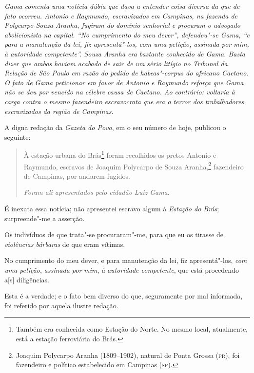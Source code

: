 \begin{flushleft}
{\footnotesize\itshape
Gama comenta uma notícia dúbia que dava a entender coisa diversa
da que de fato ocorreu. Antonio e Raymundo, escravizados em Campinas, na
fazenda de Polycarpo Souza Aranha, fugiram do domínio senhorial e
procuram o advogado abolicionista na capital. ``No cumprimento do meu
dever'', defendeu"-se Gama, ``e para a manutenção da lei, fiz
apresentá"-los, com uma petição, assinada por mim, à autoridade
competente''. Souza Aranha era bastante conhecido de Gama. Basta dizer
que ambos haviam acabado de sair de um sério litígio no Tribunal da
Relação de São Paulo em razão do pedido de \emph{habeas"-corpus} do
africano Caetano. O fato de Gama peticionar em favor de Antonio e
Raymundo reforça que Gama não se deu por vencido na célebre causa de
Caetano. Ao contrário: voltaria à carga contra o mesmo fazendeiro
escravocrata que era o terror dos trabalhadores escravizados da região
de Campinas. }
\end{flushleft}

\noindent{}A digna redação da \emph{Gazeta do Povo}, em o seu número de hoje,
publicou o seguinte:

\begin{quote}
À estação urbana do Brás\footnote{Também era conhecida como Estação
  do Norte. No mesmo local, atualmente, está a estação ferroviária do
  Brás.} foram recolhidos os pretos Antonio e Raymundo, escravos de
Joaquim Polycarpo de Souza Aranha,\footnote{Joaquim Polycarpo Aranha
  (1809--1902), natural de Ponta Grossa (\textsc{pr}), foi fazendeiro e político
  estabelecido em Campinas (\textsc{sp}).}
fazendeiro de Campinas, por
andarem fugidos.

\emph{Foram ali apresentados pelo cidadão Luiz Gama}.
\end{quote}

É inexata essa notícia; não apresentei escravo algum à \emph{Estação do
Brás}; surpreende"-me a asserção.

Os indivíduos de que trata"-se procuraram"-me, para que eu os tirasse de
\emph{violências bárbaras} de que eram vítimas.

No cumprimento do meu dever, e para manutenção da lei, fiz
apresentá"-los, \emph{com uma petição}, \emph{assinada por mim}, \emph{à}
\emph{autoridade competente}, que está procedendo a{[}s{]} diligências.

Esta é a verdade; e o fato bem diverso do que, seguramente por mal
informada, foi referido por aquela ilustre redação.

